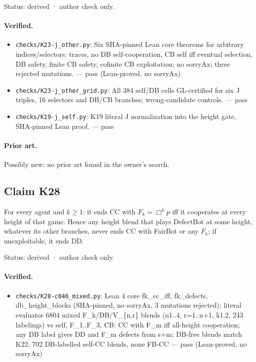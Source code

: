 \documentclass{article}
\begin{document}
Status: derived · author check only.

\paragraph{Verified.}
\begin{itemize}
\item \texttt{checks/K23-j\_other.py}: Six SHA-pinned Lean core theorems for arbitrary indices/selectors: traces, no DB self-cooperation, CB self iff eventual selection, DB safety, finite CB safety, cofinite CB exploitation; no sorryAx; three rejected mutations. --- pass (Lean-proved, no sorryAx)
\item \texttt{checks/K23-j\_other\_grid.py}: All 384 self/DB cells GL-certified for six J triples, 16 selectors and DB/CB branches; wrong-candidate controls. --- pass
\item \texttt{checks/K19-j\_self.py}: K19 literal J normalization into the height gate, SHA-pinned Lean proof. --- pass
\end{itemize}

\paragraph{Prior art.} Possibly new: no prior art found in the owner's search.

\subsection*{Claim K28}

For every agent and $k\ge1$: it ends CC with $F_k=\Box^kp$ iff it cooperates at every height of that game. Hence any height blend that plays DefectBot at some height, whatever its other branches, never ends CC with FairBot or any $F_k$; if unexploitable, it ends DD.

Status: derived · author check only.

\paragraph{Verified.}
\begin{itemize}
\item \texttt{checks/K28-c046\_mixed.py}: Lean 4 core fk\_cc\_iff, fk\_defects, db\_height\_blocks (SHA-pinned, no sorryAx, 3 mutations rejected); literal evaluator 6804 mixed F\_k/DB/V\_\{n,r\} blends (n1..4, r=1..n+1, k1,2, 243 labelings) vs self, F\_1..F\_3, CB: CC with F\_m iff all-height cooperation; any DB label gives DD and F\_m defects from s+m; DB-free blends match K22; 702 DB-labelled self-CC blends, none FB-CC --- pass (Lean-proved, no sorryAx)
\end{itemize}
\end{document}
